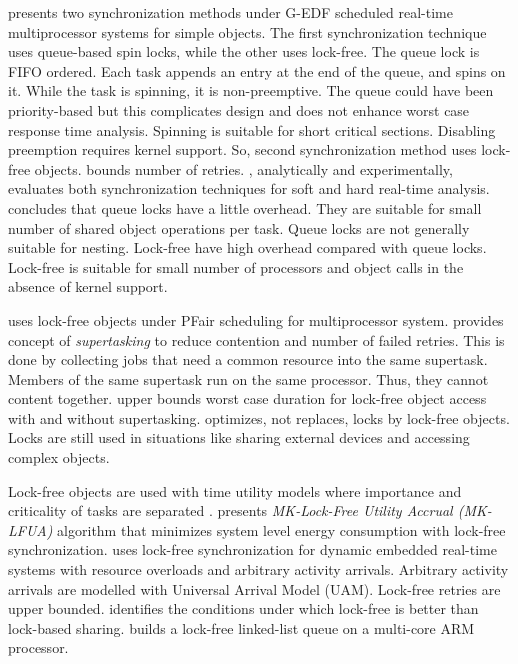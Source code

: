 \cite{key-5} presents two synchronization methods under G-EDF scheduled
real-time multiprocessor systems for simple objects. The first synchronization
technique uses queue-based spin locks, while the other uses lock-free.
The queue lock is FIFO ordered. Each task appends an entry at the
end of the queue, and spins on it. While the task is spinning, it
is non-preemptive. The queue could have been priority-based but this
complicates design and does not enhance worst case response time analysis.
Spinning is suitable for short critical sections. Disabling preemption
requires kernel support. So, second synchronization method uses lock-free
objects. \cite{key-5} bounds number of retries. \cite{key-5} , analytically
and experimentally, evaluates both synchronization techniques for
soft and hard real-time analysis. \cite{key-5} concludes that queue
locks have a little overhead. They are suitable for small number of
shared object operations per task. Queue locks are not generally suitable
for nesting. Lock-free have high overhead compared with queue locks.
Lock-free is suitable for small number of processors and object calls
in the absence of kernel support.

\cite{holman2006supporting} uses lock-free objects under PFair scheduling
for multiprocessor system. \cite{holman2006supporting} provides concept
of \textit{supertasking} to reduce contention and number of failed
retries. This is done by collecting jobs that need a common resource
into the same supertask. Members of the same supertask run on the
same processor. Thus, they cannot content together. \cite{holman2006supporting}
upper bounds worst case duration for lock-free object access with
and without supertasking. \cite{holman2006supporting} optimizes,
not replaces, locks by lock-free objects. Locks are still used in
situations like sharing external devices and accessing complex objects.

Lock-free objects are used with time utility models where importance
and criticality of tasks are separated \cite{Lai:2009:SSR:1529282.1529660,1656921}.
\cite{Lai:2009:SSR:1529282.1529660} presents \textit{MK-Lock-Free
Utility Accrual (MK-LFUA)} algorithm that minimizes system level energy
consumption with lock-free synchronization. \cite{1656921} uses lock-free
synchronization for dynamic embedded real-time systems with resource
overloads and arbitrary activity arrivals. Arbitrary activity arrivals
are modelled with Universal Arrival Model (UAM). Lock-free retries
are upper bounded. \cite{1656921} identifies the conditions under
which lock-free is better than lock-based sharing. \cite{5669659}
builds a lock-free linked-list queue on a multi-core ARM processor. 

